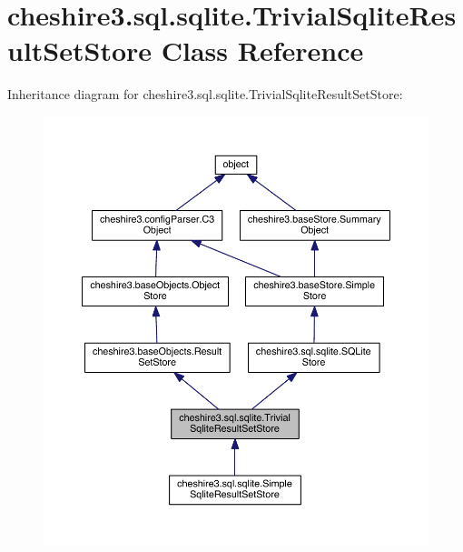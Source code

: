 \hypertarget{classcheshire3_1_1sql_1_1sqlite_1_1_trivial_sqlite_result_set_store}{\section{cheshire3.\-sql.\-sqlite.\-Trivial\-Sqlite\-Result\-Set\-Store Class Reference}
\label{classcheshire3_1_1sql_1_1sqlite_1_1_trivial_sqlite_result_set_store}
}


Inheritance diagram for cheshire3.\-sql.\-sqlite.\-Trivial\-Sqlite\-Result\-Set\-Store\-:
\nopagebreak
\begin{figure}[H]
\begin{center}
\leavevmode
\includegraphics[width=350pt]{classcheshire3_1_1sql_1_1sqlite_1_1_trivial_sqlite_result_set_store__inherit__graph}
\end{center}
\end{figure}


